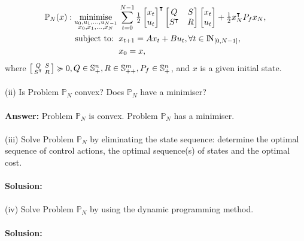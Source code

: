 \documentclass[a4paper,11pt,reqno]{amsart}
\newcommand{\N}{{\rm I\!N}}
\newcommand{\tran}{\intercal}
\DeclareMathOperator*{\minimise}{minimise}
\begin{document}
\begin{subequations}
    \begin{align}
        \mathbb{P}_N(x): \minimise_{\substack{u_0,u_1,\ldots,u_{N-1}\\ x_0,x_1,\ldots,x_N}} \,
         & \sum_{t=0}^{N-1}\textstyle\frac{1}{2}
         \begin{bmatrix}
             x_t\\
             u_t
         \end{bmatrix}^{\tran}
         \begin{bmatrix}
             Q&S\\
             S^{\tran}&R
         \end{bmatrix}
         \begin{bmatrix}
             x_t\\
             u_t
         \end{bmatrix}
         +\frac{1}{2}x_N^{\tran}P_fx_N,
        \\
        \text{subject to: }\,
         & x_{t+1} = A x_t + B u_t, \forall t\in\N_{[0, N-1]},
        \\
         & x_{0} = x,
    \end{align}
\end{subequations}
where $\begin{bsmallmatrix}Q&S\\S^{\tran}&R\end{bsmallmatrix}\succcurlyeq 0, Q\in \mathbb{S}^n_+, R\in \mathbb{S}^m_{++}, P_f\in \mathbb{S}^n_{+}$, and $x$ is a given initial state.
\\ \\
(ii) Is Problem $\mathbb{P}_N$ convex? Does $\mathbb{P}_N$ have a minimiser?
\\ \\
\textbf{Answer:} Problem $\mathbb{P}_N$ is convex. Problem $\mathbb{P}_N$ has a minimiser.
\\ \\
(iii) Solve Problem $\mathbb{P}_N$ by eliminating the state sequence: determine the optimal sequence of control actions, the optimal sequence(s) of states and the optimal cost.
\\ \\
\textbf{Solusion:}
\\ \\
(iv) Solve Problem $\mathbb{P}_N$ by using the dynamic programming method.
\\ \\
\textbf{Solusion:}
\end{document}
